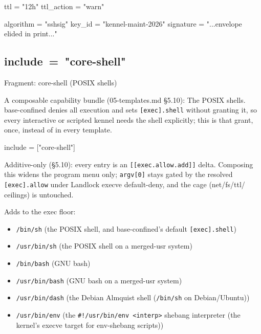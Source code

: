 \begin{kennelcode}
[lifecycle]
ttl = "12h"
ttl_action = "warn"
\end{kennelcode}

\begin{kennelcode}
[signature]
algorithm = "sshsig"
key_id = "kennel-maint-2026"
signature = "...envelope elided in print..."
\end{kennelcode}

\hypertarget{include-core-shell}{%
\subsection{\texorpdfstring{include\ =\ "core-shell"}{include = "core-shell"}}\label{include-core-shell}}

Fragment: core-shell (POSIX shells)

A composable capability bundle (05-templates.md §5.10): The POSIX
shells. base-confined denies all execution and sets
\texttt{{[}exec{]}.shell} without granting it, so every interactive or
scripted kennel needs the shell explicitly; this is that grant, once,
instead of in every template.

\begin{kennelcode}
include = ["core-shell"]
\end{kennelcode}

Additive-only (§5.10): every entry is an
\texttt{{[}{[}exec.allow.add{]}{]}} delta. Composing this widens the
program menu only; \texttt{argv{[}0{]}} stays gated by the resolved
\texttt{{[}exec{]}.allow} under Landlock execve default-deny, and the
cage (net/fs/ttl/ ceilings) is untouched.

Adds to the exec floor:

\begin{itemize}
\tightlist
\item
  \texttt{/bin/sh} (the POSIX shell, and base-confined's default
  \texttt{{[}exec{]}.shell})
\item
  \texttt{/usr/bin/sh} (the POSIX shell on a merged-usr system)
\item
  \texttt{/bin/bash} (GNU bash)
\item
  \texttt{/usr/bin/bash} (GNU bash on a merged-usr system)
\item
  \texttt{/usr/bin/dash} (the Debian Almquist shell (\texttt{/bin/sh} on
  Debian/Ubuntu))
\item
  \texttt{/usr/bin/env} (the
  \texttt{\#!/usr/bin/env\ \textless{}interp\textgreater{}} shebang
  interpreter (the kernel's execve target for env-shebang scripts))
\end{itemize}

